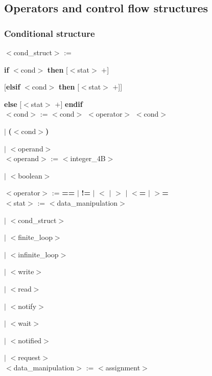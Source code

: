 \documentclass[12pt]{article}
\begin{document}
\begin{onecolumn}
\subsection{Operators and control flow structures}

\subsubsection{Conditional structure}

$<$cond\_struct$>$ := 

\textbf{if} $<$cond$>$ \textbf{then} [$<$stat$>$ $+$]

[\textbf{elsif} $<$cond$>$ \textbf{then} [$<$stat$>$ $+$]]

\textbf{else} [$<$stat$>$ $+$] \textbf{endif}\\

$<$cond$>$ := $<$cond$>$ $<$operator$>$ $<$cond$>$

\indent \indent \indent \indent $|$ \textbf{(}$<$cond$>$\textbf{)}

\indent \indent \indent \indent $|$ $<$operand$>$ \\


\indent \indent $<$operand$>$ := $<$integer\_4B$>$ 

\indent \indent \indent \indent \indent \indent $|$ $<$boolean$>$

\indent \indent $<$operator$>$ := \textbf{==} $|$ \textbf{!=} $|$ \textbf{$<$} $|$ \textbf{$>$} $|$  \textbf{$<$=} $|$ \textbf{$>$=}\\


$<$stat$>$ := $<$data\_manipulation$>$ 

\indent \indent \indent \indent $|$ $<$cond\_struct$>$ 

\indent \indent \indent \indent $|$ $<$finite\_loop$>$ 

\indent \indent \indent \indent $|$ $<$infinite\_loop$>$ 

\indent \indent \indent \indent $|$ $<$write$>$ 

\indent \indent \indent \indent $|$ $<$read$>$ 

\indent \indent \indent \indent $|$ $<$notify$>$ 

\indent \indent \indent \indent $|$ $<$wait$>$ 

\indent \indent \indent \indent $|$ $<$notified$>$ 

\indent \indent \indent \indent $|$ $<$request$>$ \\


\indent \indent $<$data\_manipulation$>$ := $<$assignment$>$ 


\end{onecolumn}
\end{document}
